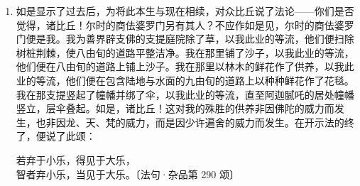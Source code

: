 \begin{enumerate}
\item 如是显示了过去后，为将此本生与现在相续，对众比丘说了法论——你们是否觉得，诸比丘！尔时的商佉婆罗门另有其人？不应作如是见，尔时的商佉婆罗门便是我。我为善界辟支佛的支提庭院除了草，以我此业的等流，他们便扫除树桩荆棘，使八由旬的道路平整洁净。我在那里铺了沙子，以我此业的等流，他们便在八由旬的道路上铺上沙子。我在那里以林木的鲜花作了供养，以我此业的等流，他们便在包含陆地与水面的九由旬的道路上以种种鲜花作了花毯。我在那支提竖起了幢幡并绑了伞，以我此业的等流，直至阿迦腻吒的居处幢幡竖立，层伞叠起。如是，诸比丘！这对我的殊胜的供养非因佛陀的威力而发生，也非因龙、天、梵的威力，而是因少许遍舍的威力而发生。在开示法的终了，便说了此颂：\begin{quoting}若弃于小乐，得见于大乐，\\智者弃小乐，当见于大乐。{\bluefootnotesize 〔法句·杂品第 290 颂〕}\end{quoting}\end{enumerate}

